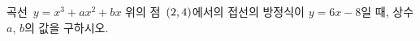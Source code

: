 곡선~$y=x^3+ax^2+bx$ 위의 점~$(2{,}\mkern3mu\mathopen{}4)$에서의 접선의 방정식이 $y=6x-8$일 때, 상수 $a$, $b$의 값을 구하시오.
